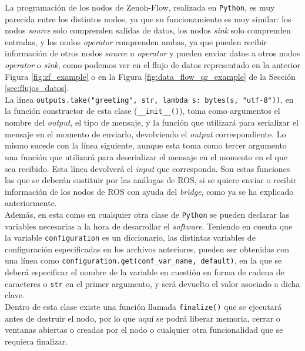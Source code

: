 La programación de los nodos de Zenoh-Flow, realizada en \texttt{Python}, es muy
parecida entre los distintos nodos, ya que su funcionamiento es muy similar: los
nodos \textit{source} solo comprenden salidas de datos, los nodos \textit{sink}
solo comprenden entradas, y los nodos \textit{operator} comprenden ambas, ya que
pueden recibir información de otros nodos \textit{source} u \textit{operator} y
pueden enviar datos a otros nodos \textit{operator} o \textit{sink}, como
podemos ver en el flujo de datos representado en la anterior Figura
\ref{fig:zf_example} o en la Figura \ref{fig:data_flow_qr_example} de la Sección
\ref{sec:flujos_datos}.
\\

La línea \verb|outputs.take("greeting", str, lambda s: bytes(s, "utf-8"))|, en
la función constructor de esta clase (\verb|__init__()|), toma como argumentos
el nombre del \textit{output}, el tipo de mensaje, y la función que utilizará
para serializar el mensaje en el momento de enviarlo, devolviendo el
\textit{output} correspondiente.
Lo mismo sucede con la línea siguiente, aunque esta toma como tercer argumento
una función que utilizará para deserializar el mensaje en el momento en el que
sea recibido.
Esta línea devolverá el \textit{input} que corresponda.
Son estas funciones las que se deberán sustituir por las análogas de ROS, si se
quiere enviar o recibir información de los nodos de ROS con ayuda del
\textit{bridge}, como ya se ha explicado anteriormente.
\\

Además, en esta como en cualquier otra clase de \texttt{Python} se pueden
declarar las variables necesarias a la hora de desarrollar el \textit{software}.
Teniendo en cuenta que la variable \verb|configuration| es un diccionario, las
distintas variables de configuración especificadas en los archivos anteriores,
pueden ser obtenidas con una línea como
\verb|configuration.get(conf_var_name, default)|, en la que se deberá
especificar el nombre de la variable en cuestión en forma de cadena de
caracteres o \texttt{str} en el primer argumento, y será devuelto el valor
asociado a dicha clave.
\\

Dentro de esta clase existe una función llamada \verb|finalize()| que se
ejecutará antes de destruir el nodo, por lo que aquí se podrá liberar memoria,
cerrar o ventanas abiertas o creadas por el nodo o cualquier otra funcionalidad
que se requiera finalizar.
\\

